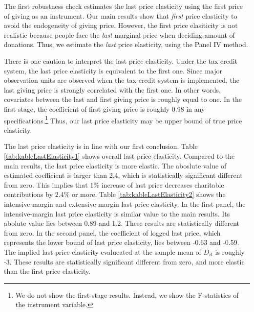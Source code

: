 \documentclass[
  11pt,
  a4paper,
]{article}
\begin{document}
  The first robustness check estimates the last price elasticity using the first price of giving as an instrument.
  Our main results show that \emph{first} price elasticity to avoid the endogeneity of giving price.
  However, the first price elasiticity is not realistic
  because people face the \emph{last} marginal price when deciding amount of donations.
  Thus, we estimate the \emph{last} price elasticity, using the Panel IV method.

  There is one caution to interpret the last price elasticity.
  Under the tax credit system, the last price elasticity is equivalent to the first one.
  Since major observation units are observed when the tax credit system is implemented,
  the last giving price is strongly correlated with the first one.
  In other words, covariates between the last and first giving price is roughly equal to one.
  In the first stage, the coefficient of first giving price is roughly 0.98 in any specifications.\footnote{We do not show the first-stage results. Instead, we show the F-statistics of the instrument variable.}
  Thus, our last price elasticity may be upper bound of true price elasticity.

  The last price elasticity is in line with our first conclusion.
  Table \ref{tab:kableLastElasticity1} shows overall last price elasticity.
  Compared to the main results, the last price elasticity is more elastic.
  The aboslute value of estimated coefficient is larger than 2.4,
  which is statistically significant different from zero.
  This implies that 1\% increase of last price decreases charitable contributions by 2.4\% or more.
  Table \ref{tab:kableLastElasticity2} shows the intensive-margin and extensive-margin last price elasticity.
  In the first panel,
  the intensive-margin last price elasticity is similar value to the main results.
  Its abolute value lies between 0.89 and 1.2.
  These results are statistically different from zero.
  In the second panel,
  the coefficient of logged last price, which represents the lower bound of last price elasticity,
  lies between -0.63 and -0.59.
  The implied last price elasticity evalueated at the sample mean of \(D_{it}\) is roughly -3.
  These results are statistically significant different from zero,
  and more elastic than the first price elasticity.
\end{document}
